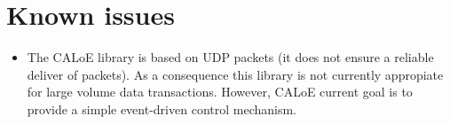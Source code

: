 \section{Known issues}

\begin{itemize}
 \item {The CALoE library is based on UDP packets (it does not ensure a reliable deliver of packets). As a consequence this library is not currently appropiate for large volume data transactions. However, CALoE current goal is to provide a simple event-driven control mechanism.}
\end{itemize}
